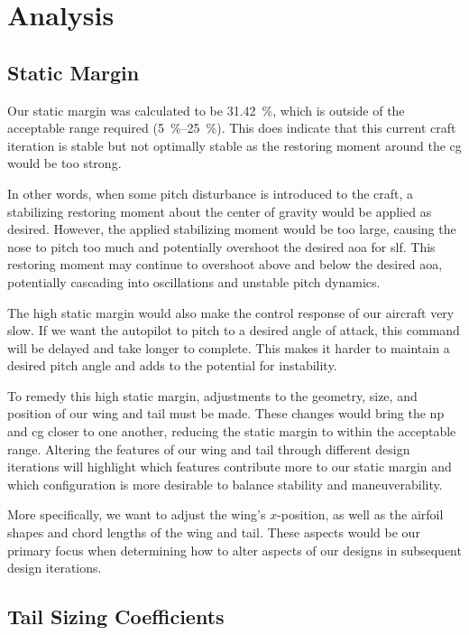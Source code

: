 \chapter{Analysis}\label{cp:analysis}

\section{Static Margin}\label{sec:static_margin}

Our static margin was calculated to be \qty{31.42}{\percent}, which is outside of the acceptable range required (\qtyrange{5}{25}{\percent}). This does indicate that this current craft iteration is stable but not optimally stable as the restoring moment around the \acrshort{cg} would be too strong.

In other words, when some pitch disturbance is introduced to the craft, a stabilizing restoring moment about the center of gravity would be applied as desired. However, the applied stabilizing moment would be too large, causing the nose to pitch too much and potentially overshoot the desired \acrshort{aoa} for \acrshort{slf}. This restoring moment may continue to overshoot above and below the desired \acrshort{aoa}, potentially cascading into oscillations and unstable pitch dynamics.

The high static margin would also make the control response of our aircraft very slow. If we want the autopilot to pitch to a desired angle of attack, this command will be delayed and take longer to complete. This makes it harder to maintain a desired pitch angle and adds to the potential for instability. 

To remedy this high static margin, adjustments to the geometry, size, and position of our wing and tail must be made. These changes would bring the \acrshort{np} and \acrshort{cg} closer to one another, reducing the static margin to within the acceptable range. Altering the features of our wing and tail through different design iterations will highlight which features contribute more to our static margin and which configuration is more desirable to balance stability and maneuverability. 

More specifically, we want to adjust the wing's $x$-position, as well as the airfoil shapes and chord lengths of the wing and tail. These aspects would be our primary focus when determining how to alter aspects of our designs in subsequent design iterations.

\section{Tail Sizing Coefficients}\label{sec:tail_sizing}

